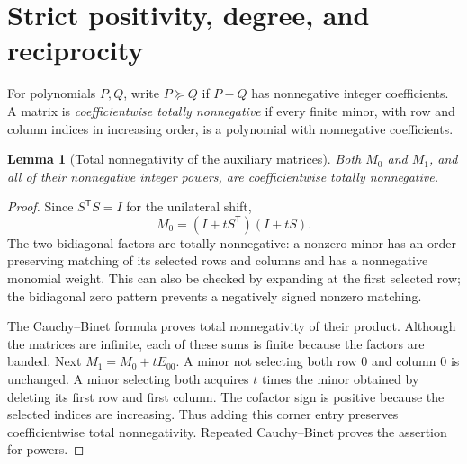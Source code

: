 \documentclass[11pt]{article}
\newtheorem{lemma}[theorem]{Lemma}
\theoremstyle{definition}
\theoremstyle{remark}
\newcommand{\coeffge}{\succeq}
\numberwithin{equation}{section}
\begin{document}
\section{Strict positivity, degree, and reciprocity}
\label{sec:positive}

For polynomials $P,Q$, write $P\coeffge Q$ if $P-Q$ has nonnegative
integer coefficients. A matrix is \emph{coefficientwise totally nonnegative}
if every finite minor, with row and column indices in increasing order,
is a polynomial with nonnegative coefficients.

\begin{lemma}[Total nonnegativity of the auxiliary matrices]
\label{lem:TP}
Both $M_0$ and $M_1$, and all of their nonnegative integer powers, are
coefficientwise totally nonnegative.
\end{lemma}
\begin{proof}
Since $S^{\mathsf T}S=I$ for the unilateral shift,
\begin{equation}
 M_0=(I+tS^{\mathsf T})(I+tS).
 \label{eq:bidiagonal}
\end{equation}
The two bidiagonal factors are totally nonnegative: a nonzero minor has
an order-preserving matching of its selected rows and columns and has a
nonnegative monomial weight. This can also be checked by expanding at the
first selected row; the bidiagonal zero pattern prevents a negatively
signed nonzero matching.

The Cauchy--Binet formula proves total nonnegativity of their product.
Although the matrices are infinite, each of these sums is finite because
the factors are banded. Next $M_1=M_0+tE_{00}$. A minor not selecting both
row $0$ and column $0$ is unchanged. A minor selecting both acquires
$t$ times the minor obtained by deleting its first row and first column.
The cofactor sign is positive because the selected indices are increasing.
Thus adding this corner entry preserves coefficientwise total
nonnegativity. Repeated Cauchy--Binet proves the assertion for powers.
\end{proof}
\end{document}

